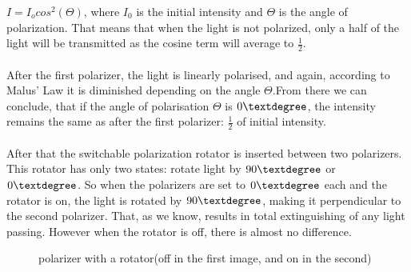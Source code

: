 \documentclass[english]{article}
\begin{document}
$I=I_ocos^2(\Theta)$, where $I_0$ is the initial intensity and $\Theta$ is the angle of polarization.
That means that when the light is not polarized, only a half of the light will be transmitted as the cosine term will average to $\frac{1}{2}$.\\
\\
After the first polarizer, the light is linearly polarised, and again, according to Malus' Law it is diminished depending on the angle $\Theta$.From there we can conclude, that if the angle of polarisation $\Theta$ is $0\textdegree$, the intensity remains the same as after the first polarizer: $\frac{1}{2}$ of initial intensity. \\
\\
After that the switchable polarization rotator is inserted between two polarizers.
This rotator has only two states: rotate light by $90\textdegree$ or $0\textdegree$. 
So when the polarizers are set to $0\textdegree$ each and the rotator is on, the light is rotated by $90\textdegree$, making it perpendicular to the second polarizer. 
That, as we know, results in total extinguishing of any light passing. 
However when the rotator is off, there is almost no difference.\\
\begin{figure}[H]
	\centering
	\caption{polarizer with a rotator(off in the first image, and on in the second)}
	\label{fig:seven}
\end{figure}
\end{document}
